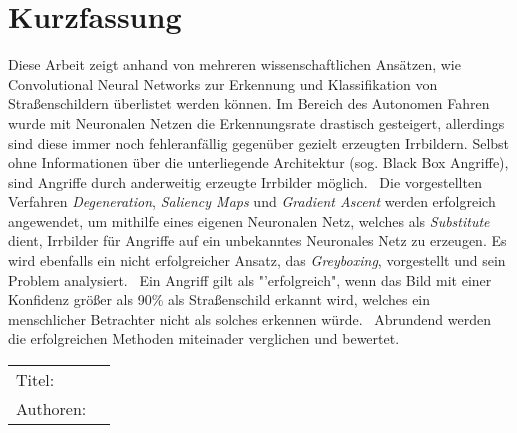 \chapter*{Kurzfassung} 
Diese Arbeit zeigt anhand von mehreren wissenschaftlichen Ansätzen, wie Convolutional Neural Networks zur Erkennung und Klassifikation von Straßenschildern überlistet werden können.
Im Bereich des Autonomen Fahren wurde mit Neuronalen Netzen die Erkennungsrate drastisch gesteigert, allerdings sind diese immer noch fehleranfällig gegenüber gezielt erzeugten Irrbildern. Selbst ohne Informationen über die unterliegende Architektur (sog. Black Box Angriffe), sind Angriffe durch anderweitig erzeugte Irrbilder möglich.
~\newline Die vorgestellten Verfahren \textit{Degeneration}, \textit{Saliency Maps} und \textit{Gradient Ascent} werden erfolgreich angewendet, um mithilfe eines eigenen Neuronalen Netz, welches als \textit{Substitute} dient, Irrbilder für Angriffe auf ein unbekanntes Neuronales Netz zu erzeugen. Es wird ebenfalls ein nicht erfolgreicher Ansatz, das \textit{Greyboxing}, vorgestellt und sein Problem analysiert.
~\newline Ein Angriff gilt als "'erfolgreich", wenn das Bild mit einer Konfidenz größer als 90\% als Straßenschild erkannt wird, welches ein menschlicher Betrachter nicht als solches erkennen würde.
~\newline Abrundend werden die erfolgreichen Methoden miteinader verglichen und bewertet. 
~\newline 
~\newline
\begin{flushleft}
	\begin{tabular}{lp{11cm}}
		Titel:&  \titel \\ 
		Authoren:&  \autor \\
	\end{tabular} 
\end{flushleft}
